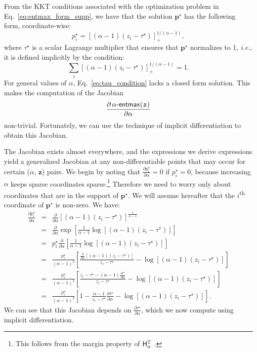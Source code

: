 \documentclass[11pt,a4paper]{article}
\makeatletter
\newcommand*{\ie}{\textit{i.\hspace{.07em}e.}\@\xspace}
\newcommand\xx{z}
\newcommand\x{\bm{\xx}}
\newcommand{\HHt}{\mathsf{H}^{\textsc{T}}}
\newcommand*\entmaxtext{entmax\xspace}
\newcommand*\aentmax[1][\alpha]{\mathop{\mathsf{#1}\textnormal{-}\mathsf{\entmaxtext}}}
\makeatother
\begin{document}
From the KKT conditions associated with the optimization problem in
Eq.~\ref{eq:entmax_form_supp}, we have that the solution $\bm{p}^{\star}$ has the following form, coordinate-wise:
\begin{equation}\label{eq:p_kkt}
    p_i^{\star} = [(\alpha-1)(z_i - \tau^{\star})]_+^{1/(\alpha-1)},
\end{equation}
where $\tau^{\star}$ is a scalar Lagrange multiplier that ensures that
$\bm{p}^{\star}$ normalizes to 1, \ie, it is defined implicitly by the condition:
\begin{equation}\label{eq:tau_condition}
    \sum_i [(\alpha-1)(z_i - \tau^{\star})]_+^{1/(\alpha-1)} = 1.
\end{equation}
For general values of $\alpha$, Eq.~\ref{eq:tau_condition} lacks a closed form solution. This makes the computation of the
Jacobian
\begin{equation}
    \frac{\partial \aentmax(\bm{z})}{\partial \alpha}
\end{equation}
non-trivial. Fortunately, we can use the technique of implicit differentiation
to obtain this Jacobian.

The Jacobian exists almost everywhere, and the expressions we derive
expressions yield a generalized Jacobian \citep{clarke_book} at any
non-differentiable points that may occur for certain ($\alpha$, $\x$) pairs.
We begin by noting that $\frac{\partial p_i^{\star}}{\partial \alpha} = 0$ if
$p_i^{\star} = 0$, because increasing $\alpha$ keeps sparse coordinates
sparse.\footnote{This follows from the margin property of $\HHt_\alpha$
 \citep{blondel2019learning}.}
Therefore we need to worry only
about coordinates that are in the support of $\bm{p}^\star$. We will assume
hereafter that the $i$\textsuperscript{th} coordinate of $\bm{p}^\star$ is non-zero.
We have:
\begin{eqnarray}\label{eq:gradient_alpha_01}
    \frac{\partial p_i^{\star}}{\partial \alpha} &=& \frac{\partial}{\partial \alpha} [(\alpha-1)(z_i - \tau^{\star})]^{\frac{1}{\alpha-1}}\nonumber\\
    &=& \frac{\partial}{\partial \alpha} \exp \left[\frac{1}{\alpha-1} \log [(\alpha-1)(z_i - \tau^{\star})]\right]\nonumber\\
    &=& p_i^{\star} \frac{\partial}{\partial \alpha} \left[\frac{1}{\alpha-1} \log [(\alpha-1)(z_i - \tau^{\star})]\right]\nonumber\\
    &=& \frac{p_i^{\star}}{(\alpha-1)^2} \left[\frac{\frac{\partial}{\partial \alpha} [(\alpha-1)(z_i - \tau^{\star})]}{z_i - \tau^{\star}} - \log[(\alpha-1)(z_i - \tau^{\star})] \right]\nonumber\\
    &=& \frac{p_i^{\star}}{(\alpha-1)^2} \left[\frac{z_i - \tau^{\star} - (\alpha-1)\frac{\partial \tau^{\star}}{\partial \alpha} }{z_i - \tau^{\star}} - \log[(\alpha-1)(z_i - \tau^{\star})] \right]\nonumber\\
    &=& \frac{p_i^{\star}}{(\alpha-1)^2} \left[1 - \frac{\alpha-1}{z_i - \tau^{\star}}\frac{\partial \tau^{\star}}{\partial \alpha} - \log[(\alpha-1)(z_i - \tau^{\star})] \right].
\end{eqnarray}
We can see that this Jacobian depends on $\frac{\partial \tau^{\star}}{\partial \alpha}$, which we now compute using implicit differentiation.
\end{document}
